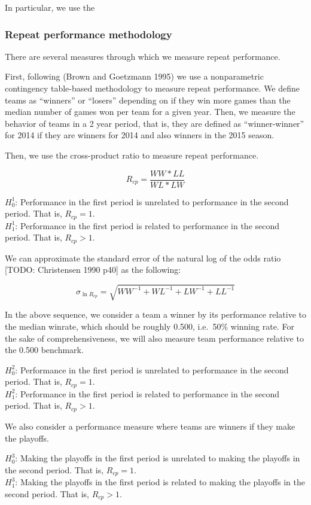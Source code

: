 In particular, we use the

\subsubsection{Repeat performance
methodology}\label{repeat-performance-methodology}

There are several measures through which we measure repeat performance.

First, following (Brown and Goetzmann 1995) we use a nonparametric
contingency table-based methodology to measure repeat performance. We
define teams as ``winners'' or ``losers'' depending on if they win more
games than the median number of games won per team for a given year.
Then, we measure the behavior of teams in a 2 year period, that is, they
are defined as ``winner-winner'' for 2014 if they are winners for 2014
and also winners in the 2015 season.

Then, we use the cross-product ratio to measure repeat performance.

\[R_{cp} = \frac{WW * LL}{WL*LW} \]

\(H_{0}^1\): Performance in the first period is unrelated to performance
in the second period. That is, \(R_{cp} = 1\).\\
\(H_{1}^1\): Performance in the first period is related to performance
in the second period. That is, \(R_{cp} > 1\).

We can approximate the standard error of the natural log of the odds
ratio {[}TODO: Christensen 1990 p40{]} as the following:

\[\sigma_{\ln R_{cp}} = \sqrt{WW^{-1} + WL^{-1} + LW^{-1} + LL^{-1}}\]

In the above sequence, we consider a team a winner by its performance
relative to the median winrate, which should be roughly 0.500, i.e.~50\%
winning rate. For the sake of comprehensiveness, we will also measure
team performance relative to the 0.500 benchmark.

\(H_{0}^2\): Performance in the first period is unrelated to performance
in the second period. That is, \(R_{cp} = 1\).\\
\(H_{1}^2\): Performance in the first period is related to performance
in the second period. That is, \(R_{cp} > 1\).

We also consider a performance measure where teams are winners if they
make the playoffs.

\(H_{0}^3\): Making the playoffs in the first period is unrelated to
making the playoffs in the second period. That is, \(R_{cp} = 1\).\\
\(H_{1}^3\): Making the playoffs in the first period is related to
making the playoffs in the second period. That is, \(R_{cp} > 1\).

